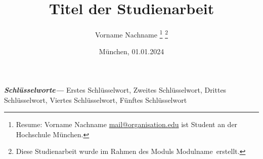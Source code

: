 \title{Titel der Studienarbeit}
\author{
    Vorname Nachname
    \thanks{Resume: Vorname Nachname \href{mailto:mail@organisation.edu}{mail@organisation.edu} ist Student an der Hochschule München.}%
    \thanks{Diese Studienarbeit wurde im Rahmen des Moduls \glqq Modulname\grqq\ erstellt.}%
}
\date{München, 01.01.2024}
\maketitle

\vspace{-1cm} %



\providecommand{\keywords}[1]
{
  \small	
  \textbf{\textit{Schlüsselworte---}} #1
}
\keywords{
    Erstes Schlüsselwort, Zweites Schlüsselwort, Drittes Schlüsselwort, Viertes Schlüsselwort, Fünftes Schlüsselwort
}
